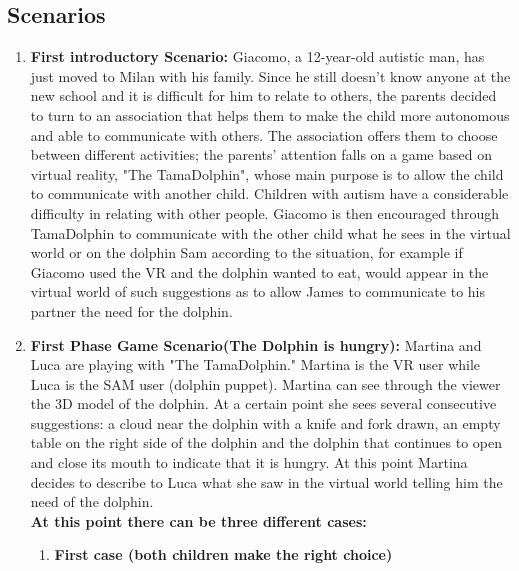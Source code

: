 \documentclass [12pt]{article}
\begin{document}
\subsection{Scenarios}
\begin{enumerate}
\item \textbf{First introductory Scenario:}
Giacomo, a 12-year-old autistic man, has just moved to Milan with his family.
Since he still doesn't know anyone at the new school and it is difficult for him to relate to others, the parents decided to turn to an association that helps them to make the child more autonomous and able to communicate with others. The association offers them to choose between different activities; the parents' attention falls on a game based on virtual reality, "The TamaDolphin", whose main purpose is to allow the child to communicate with another child.
Children with autism have a considerable difficulty in relating with other people. Giacomo is then encouraged through TamaDolphin to communicate with the other child what he sees in the virtual world or on the dolphin Sam according to the situation, for example if Giacomo used the VR and the dolphin wanted to eat, would appear in the virtual world of such suggestions as to allow James to communicate to his partner the need for the dolphin.
\item \textbf{ First Phase Game Scenario(The Dolphin is hungry):}
Martina and Luca are playing with "The TamaDolphin." Martina is the VR user while Luca is the SAM user (dolphin puppet). Martina can see through the viewer the 3D model of the dolphin. At a certain point she sees several consecutive suggestions: a cloud near the dolphin with a knife and fork drawn, an empty table on the right side of the dolphin and the dolphin that continues to open and close its mouth to indicate that it is hungry. At this point Martina decides to describe to Luca what she saw in the virtual world telling him the need of the dolphin. \\
\textbf{At this point there can be three different cases:}
\begin{enumerate}
\item \textbf{ First case (both children make the right choice)}\\

\end{enumerate}
\end{enumerate}
\end{document}

